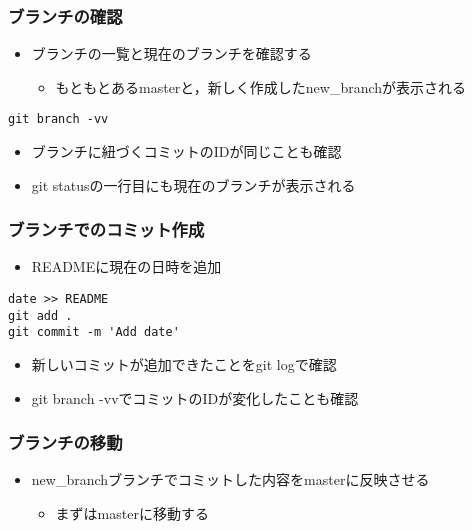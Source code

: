 \documentclass[a4paper,twoside,twocolumn]{bxjsarticle}
\begin{document}
\subsubsection{ブランチの確認}
\label{sec-1-6-4}
\begin{itemize}
\item ブランチの一覧と現在のブランチを確認する
\begin{itemize}
\item もともとあるmasterと，新しく作成したnew\_branchが表示される
\end{itemize}
\end{itemize}

\begin{verbatim}
git branch -vv
\end{verbatim}

\begin{itemize}
\item ブランチに紐づくコミットのIDが同じことも確認
\item git statusの一行目にも現在のブランチが表示される
\end{itemize}

\subsubsection{ブランチでのコミット作成}
\label{sec-1-6-5}
\begin{itemize}
\item READMEに現在の日時を追加
\end{itemize}

\begin{verbatim}
date >> README
git add .
git commit -m 'Add date'
\end{verbatim}

\begin{itemize}
\item 新しいコミットが追加できたことをgit logで確認
\item git branch -vvでコミットのIDが変化したことも確認
\end{itemize}

\subsubsection{ブランチの移動}
\label{sec-1-6-6}
\begin{itemize}
\item new\_branchブランチでコミットした内容をmasterに反映させる
\begin{itemize}
\item まずはmasterに移動する
\end{itemize}
\end{itemize}
\end{document}
